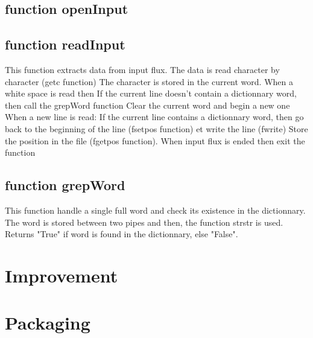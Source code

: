 \documentclass[11pt]{article} %
\begin{document}
\subsection{function openInput}
\subsection{function readInput}
This function extracts data from input flux. The data is read character by character (getc function)
The character is stored in the current word.
When a white space is read then
If the current line doesn't contain a dictionnary word, then call the grepWord function
Clear the current word and begin a new one
When a new line is read:
If the current line contains a dictionnary word, then go back to the beginning of the line (fsetpos function) et write the line (fwrite)
Store the position in the file (fgetpos function).
When input flux is ended then exit the function

\subsection{function grepWord}
This function handle a single full word and check its existence in the dictionnary.
The word is stored between two pipes and then, the function strstr is used.
Returns "True" if word is found in the dictionnary, else "False".

\section{Improvement}

\section{Packaging}
\end{document}
